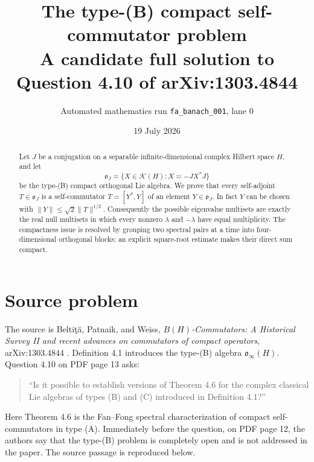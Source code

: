 \documentclass[11pt]{article}
\title{The type-(B) compact self-commutator problem\\
\large A candidate full solution to Question 4.10 of arXiv:1303.4844}
\author{Automated mathematics run \texttt{fa\_banach\_001}, lane 0}
\date{19 July 2026}
\newcommand{\K}{\mathcal K}
\newcommand{\ooJ}{\mathfrak o_J}
\newcommand{\1}{\mathbf 1}
\newcommand{\norm}[1]{\lVert #1\rVert}
\begin{document}
\maketitle

\begin{center}
\end{center}

\begin{abstract}
Let $J$ be a conjugation on a separable infinite-dimensional complex Hilbert
space $H$, and let
\[
 \ooJ=\{X\in\K(H):X=-JX^*J\}
\]
be the type-(B) compact orthogonal Lie algebra.  We prove that every
self-adjoint $T\in\ooJ$ is a self-commutator $T=[Y^*,Y]$ of an element
$Y\in\ooJ$.  In fact $Y$ can be chosen with
$\norm{Y}\leq\sqrt2\norm{T}^{1/2}$.  Consequently the possible eigenvalue
multisets are exactly the real null multisets in which every nonzero
$\lambda$ and $-\lambda$ have equal multiplicity.  The compactness issue is
resolved by grouping two spectral pairs at a time into four-dimensional
orthogonal blocks; an explicit square-root estimate makes their direct sum
compact.
\end{abstract}

\section{Source problem}

The source is Belti\c t\u a, Patnaik, and Weiss,
\emph{$B(H)$-Commutators: A Historical Survey II and recent advances on
commutators of compact operators}, arXiv:1303.4844 \cite{BPW}.
Definition 4.1 introduces the type-(B) algebra $\mathfrak o_\infty(H)$.
Question 4.10 on PDF page 13 asks:

\begin{quote}
``Is it possible to establish versions of Theorem 4.6 for the complex
classical Lie algebras of types (B) and (C) introduced in Definition 4.1?''
\end{quote}

Here Theorem 4.6 is the Fan--Fong spectral characterization of compact
self-commutators in type (A).  Immediately before the question, on PDF page
12, the authors say that the type-(B) problem is completely open and is not
addressed in the paper.  The source passage is reproduced below.
\end{document}
